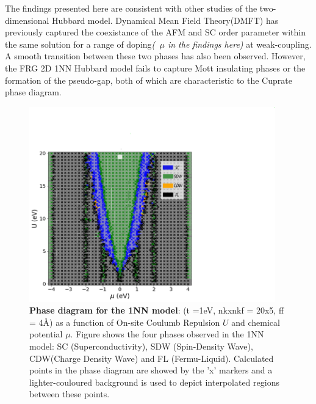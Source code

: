 \documentclass[12pt]{article}
\begin{document}
\medskip

\noindent The findings presented here are consistent with other studies of the two-dimensional Hubbard model. Dynamical Mean Field Theory(DMFT) has previously captured the 
coexistance of the AFM and SC order parameter within the same solution for 
a range of doping\textit{(~$\mu$ in the findings here)} at weak-coupling. A smooth transition between these two phases has also been observed\cite{capone2006competition}. 
However, the FRG 2D 1NN Hubbard model fails to capture Mott insulating phases or the formation of the 
pseudo-gap\cite{katanin2009comparing,otsuki2014superconductivity}, both of which are characteristic to the Cuprate phase diagram. 





\begin{figure}[htbp]  %
    \centering
    \includegraphics[width=0.95\textwidth]{1NNphased.png}  %
    \caption{\textbf{Phase diagram for the 1NN model}:  (t =1eV, nkxnkf = 20x5, ff = 4\AA) as a function of On-site Coulumb Repulsion $U$ and chemical potential $\mu$. 
    Figure shows the four phases observed in the 1NN model: SC (Superconductivity), SDW (Spin-Density Wave), CDW(Charge Density Wave) and FL (Fermu-Liquid).
    Calculated points in the phase diagram are showed by the 'x' markers and a lighter-couloured background is used to depict interpolated regions between these points. }
    \label{fig:1NNpd}
\end{figure}
\end{document}
